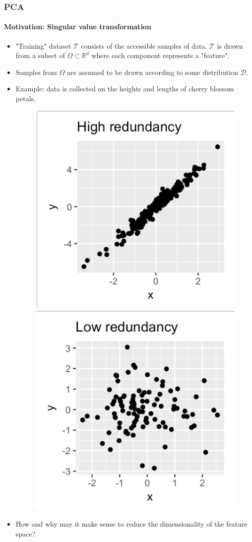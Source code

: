 \documentclass{beamer}
\newcommand\0{\mathbf{0}}
\newcommand\RR{\mathbb{R}}
\newcommand\<{\langle}
\renewcommand\>{\rangle}
\begin{document}
  \begin{frame}
  	\frametitle{PCA}
    \framesubtitle{Motivation: Singular value transformation}
    \begin{itemize}
    \item "Training" dataset $\mathcal{T}$ consists of the accessible samples of data. $\mathcal{T}$ is drawn from a subset of $\Omega \subset \RR^d$ where each component represents a "feature". 
    \item Samples from $\Omega$ are assumed to be drawn according to some distribution $\mathcal{D}$. 
    \pause
    \item Example: data is collected on the heights and lengths of cherry blossom petals. 
    \begin{figure}
   \includegraphics[width= 0.3\linewidth]{pca_high_redundancy.png}
   \includegraphics[width= 0.3\linewidth]{pca_low_redundancy}	
\end{figure}
\item How and why may it make sense to reduce the dimensionality of the feature space?
\end{itemize}
\end{frame}
\end{document}
